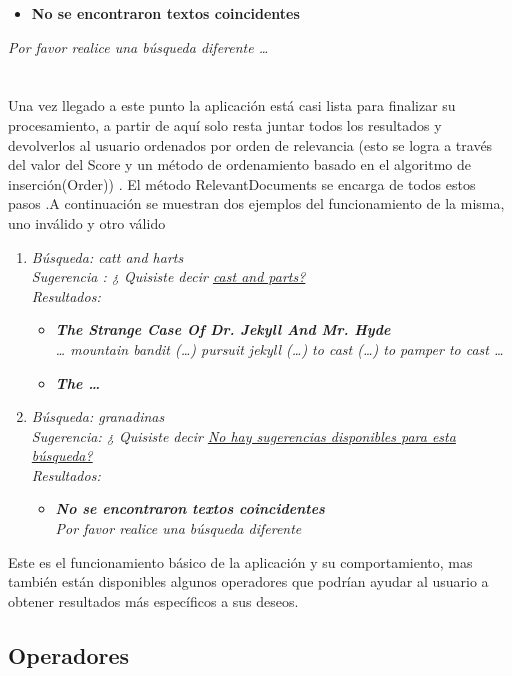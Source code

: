 \documentclass[options]{article}
\begin{document}
\begin{itemize}
    \item \textbf{No se encontraron textos coincidentes}
\end{itemize}
\textit{Por favor realice una búsqueda diferente …}\\
\\
\\
Una vez llegado a este punto la aplicación está casi lista para finalizar su procesamiento, a partir de aquí solo resta juntar todos los resultados y devolverlos al usuario ordenados por orden de relevancia (esto se logra a través del valor del Score y un método de ordenamiento basado en el algoritmo de inserción(Order)) . El método RelevantDocuments se encarga de todos estos pasos .A continuación se muestran dos ejemplos del funcionamiento de la misma, uno inválido y otro válido
\begin{enumerate}
    \item \textit{Búsqueda: catt and harts}\\
    \textit{Sugerencia : ¿ Quisiste decir \underline{cast and parts?}}\\
    \textit{Resultados:}
    \begin{itemize}
        \item \textbf{\textit{The Strange Case Of Dr. Jekyll And Mr. Hyde}}\\
        \textit{… mountain bandit (…) pursuit jekyll (…) to cast (…) to pamper to cast …}
        \item \textbf{\textit{The …}}
    \end{itemize}
    \item \textit{Búsqueda: granadinas}\\
    \textit{Sugerencia: ¿ Quisiste decir \underline{No hay sugerencias disponibles para esta búsqueda?}}\\
    \textit{Resultados:}
    \begin{itemize}
        \item \textbf{\textit{No se encontraron textos coincidentes}}\\
        \textit{Por favor realice una búsqueda diferente}
    \end{itemize}
\end{enumerate}
Este es el funcionamiento básico de la aplicación y su comportamiento, mas también están disponibles algunos operadores que podrían ayudar al usuario a obtener resultados más específicos a sus deseos.
\subsection{Operadores}
\end{document}
